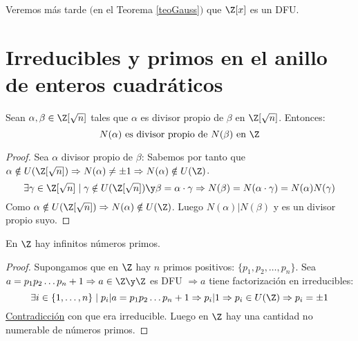 Veremos más tarde $($en el Teorema \ref{teoGauss}$)$ que $\Z[x]$ es un DFU.

\newpage
\section{Irreducibles y primos en el anillo de enteros cuadráticos}

\begin{lema}
    Sean $\alpha, \beta \in \Z[\sqrt{n}]$ tales que $\alpha$ es divisor propio de $\beta$ en $\Z[\sqrt{n}]$. Entonces:
    $$N(\alpha) \mbox{ es divisor propio de } N(\beta) \mbox{ en } \Z$$
\begin{proof}
    Sea $\alpha$ divisor propio de $\beta$:\newline
    Sabemos por tanto que $\alpha \notin U(\Z[\sqrt{n}]) \Rightarrow N(\alpha) \neq \pm 1 \Rightarrow N(\alpha) \notin U(\Z)$.
    \newline
    $$\exists \gamma \in \Z[\sqrt{n}] \mid \gamma \notin U(\Z[\sqrt{n}]) \y \beta = \alpha \cdot \gamma \Rightarrow
        N(\beta) = N(\alpha \cdot \gamma) = N(\alpha)N(\gamma)$$
    Como $\alpha \notin U(\Z[\sqrt{n}]) \Rightarrow N(\alpha) \notin U(\Z)$.\newline
    Luego $N(\alpha)|N(\beta)$ y es un divisor propio suyo.
\end{proof}
\end{lema}


\begin{teo}
    En $\Z$ hay infinitos números primos.
\begin{proof}
    Supongamos que en $\Z$ hay $n$ primos positivos: $\{p_1, p_2, \ldots, p_n\}$.\newline
    Sea $a=p_1p_2\ldots p_n +1 \Rightarrow a \in \Z \y \Z$ es DFU $\Rightarrow a$ tiene factorización en irreducibles:
    $$\exists i \in \{1, \ldots, n\} \mid p_i|a=p_1p_2\ldots p_n+1 \Rightarrow p_i|1 \Rightarrow p_i \in U(\Z) \Rightarrow
        p_i = \pm 1$$
    \underline{Contradicción} con que era irreducible. Luego en $\Z$ hay una cantidad no numerable de números primos.
\end{proof}
\end{teo}

